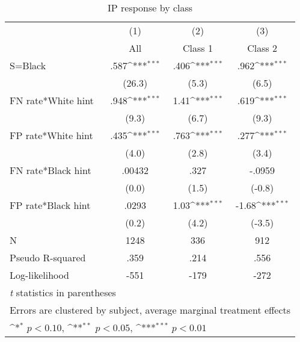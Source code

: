 \begin{table}[htbp]\centering
\def\sym#1{\ifmmode^{#1}\else\(^{#1}\)\fi}
\caption{IP response by class}
\begin{tabular}{l*{3}{c}}
\hline\hline
                &\multicolumn{1}{c}{(1)}&\multicolumn{1}{c}{(2)}&\multicolumn{1}{c}{(3)}\\
                &\multicolumn{1}{c}{All}&\multicolumn{1}{c}{Class 1}&\multicolumn{1}{c}{Class 2}\\
\hline
S=Black         &     .587\sym{***}&     .406\sym{***}&     .962\sym{***}\\
                &   (26.3)         &    (5.3)         &    (6.5)         \\
FN rate*White hint&     .948\sym{***}&     1.41\sym{***}&     .619\sym{***}\\
                &    (9.3)         &    (6.7)         &    (9.3)         \\
FP rate*White hint&     .435\sym{***}&     .763\sym{***}&     .277\sym{***}\\
                &    (4.0)         &    (2.8)         &    (3.4)         \\
FN rate*Black hint&   .00432         &     .327         &   -.0959         \\
                &    (0.0)         &    (1.5)         &   (-0.8)         \\
FP rate*Black hint&    .0293         &     1.03\sym{***}&    -1.68\sym{***}\\
                &    (0.2)         &    (4.2)         &   (-3.5)         \\
\hline
N               &     1248         &      336         &      912         \\
Pseudo R-squared&     .359         &     .214         &     .556         \\
Log-likelihood  &     -551         &     -179         &     -272         \\
\hline\hline
\multicolumn{4}{l}{\footnotesize \textit{t} statistics in parentheses}\\
\multicolumn{4}{l}{\footnotesize Errors are clustered by subject, average marginal treatment effects}\\
\multicolumn{4}{l}{\footnotesize \sym{*} \(p<0.10\), \sym{**} \(p<0.05\), \sym{***} \(p<0.01\)}\\
\end{tabular}
\end{table}

